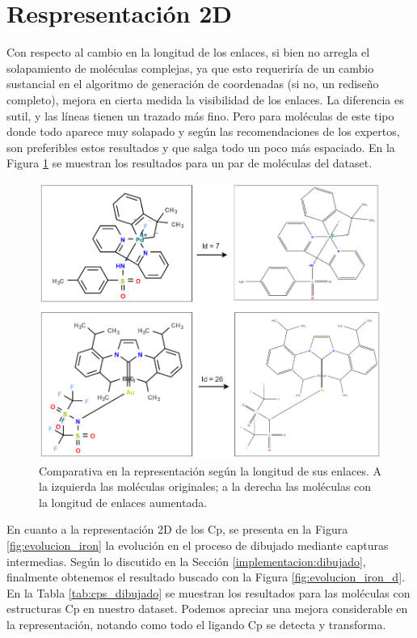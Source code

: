 \newpage

\section{Respresentación 2D}
Con respecto al cambio en la longitud de los enlaces, si bien no arregla el solapamiento de moléculas complejas, ya que esto requeriría de un cambio sustancial en el algoritmo de generación de coordenadas (si no, un rediseño completo), mejora en cierta medida la visibilidad de los enlaces. La diferencia es sutil, y las líneas tienen un trazado más fino. Pero para moléculas de este tipo donde todo aparece muy solapado y según las recomendaciones de los expertos, son preferibles estos resultados y que salga todo un poco más espaciado. En la Figura \ref{fig:bonds_longitud} se muestran los resultados para un par de moléculas del dataset.

\begin{figure}[h]
    \centering
    \includegraphics[scale=0.51]{imagenes/resultados/bond_longitud.png}
    \caption{Comparativa en la representación según la longitud de sus enlaces. A la izquierda las moléculas originales; a la derecha las moléculas con la longitud de enlaces aumentada.}
    \label{fig:bonds_longitud}
\end{figure}


En cuanto a la representación 2D de los Cp, se presenta en la Figura \ref{fig:evolucion_iron} la evolución en el proceso de dibujado mediante capturas intermedias. Según lo discutido en la Sección \ref{implementacion:dibujado}, finalmente obtenemos el resultado buscado con la Figura \ref{fig:evolucion_iron_d}. En la Tabla \ref{tab:cps_dibujado} se muestran los resultados para las moléculas con estructuras Cp en nuestro dataset. Podemos apreciar una mejora considerable en la representación, notando como todo el ligando Cp se detecta y transforma.


